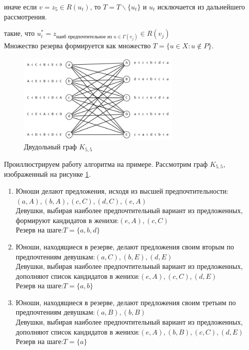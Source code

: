 \documentclass{article}
\begin{document}
\begin{enumerate}
\begin{enumerate}
    \qquad\qquad иначе если $v = z_5 \in R(u_t)$, то $T = T\backslash \{u_t\}$ и $u_t$ исключается из дальнейшего рассмотрения.

    
    такие, что $u_i^* = z_{\text{наиб предпочтительное из }u \in\Gamma(v_j)} \in R(v_j)$\\
    Множество резерва формируется как множество $T = \{u\in X: u \not\in P\}$.
\end{enumerate}
\begin{figure}[ht]
    \includegraphics[width=0.7\textwidth, center]{attachments/11/full/0.png}
    \caption{Двудольный граф $K_{5,5}$}
    \label{fig:11_graph}
\end{figure}
Проиллюстрируем работу алгоритма на примере. Рассмотрим граф $K_{5,5}$, изображенный на рисунке \ref{fig:11_graph}.
\begin{enumerate}
    \item[\textit{Шаг 1}] Юноши делают предложения, исходя из высшей предпочтительности:\qquad $(a,A),(b,A),(c,C),(d,C),(e,A)$\\
    Девушки, выбирая наиболее предпочтительный вариант из предложенных, формируют кандидатов в женихи:\qquad $(e,A),(c,C)$\\
    Резерв на шаге:\qquad $T =\{a,b,d\}$ 
    
    \item[\textit{Шаг 2}] Юноши, находящиеся в резерве, делают предложения своим вторым по предпочтениям девушкам:\qquad $(a,C),(b,E),(d,E)$\\
    Девушки, выбирая наиболее предпочтительный вариант из предложенных, дополняют список кандидатов в женихи:\qquad $(e,A),(c,C),(d,E)$\\
    Резерв на шаге:\qquad $T =\{a,b\}$
    
    \item[\textit{Шаг 3}] Юноши, находящиеся в резерве, делают предложения своим третьим по предпочтениям девушкам:\qquad $(a,B),(b,B)$\\
    Девушки, выбирая наиболее предпочтительный вариант из предложенных, дополняют список кандидатов в женихи:\qquad $(e,A),(b,B),(c,C),(d,E)$\\
    Резерв на шаге:\qquad $T =\{a\}$
    

\end{enumerate}
\end{enumerate}
\end{document}
